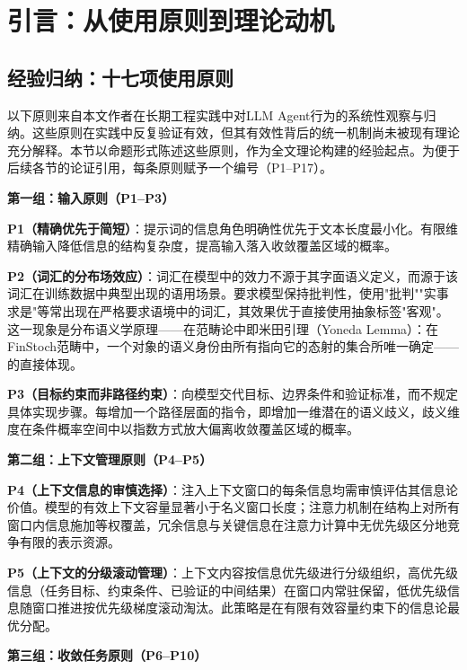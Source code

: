 \documentclass[11pt,a4paper]{article}
\theoremstyle{definition}
\begin{document}
\section{引言：从使用原则到理论动机}
\label{sec:intro}

\subsection{经验归纳：十七项使用原则}

以下原则来自本文作者在长期工程实践中对LLM Agent行为的系统性观察与归纳。这些原则在实践中反复验证有效，但其有效性背后的统一机制尚未被现有理论充分解释。本节以命题形式陈述这些原则，作为全文理论构建的经验起点。为便于后续各节的论证引用，每条原则赋予一个编号（P1--P17）。

\medskip
\textbf{第一组：输入原则（P1--P3）}

\textbf{P1（精确优先于简短）}：提示词的信息角色明确性优先于文本长度最小化。有限维精确输入降低信息的结构复杂度，提高输入落入收敛覆盖区域的概率。

\textbf{P2（词汇的分布场效应）}：词汇在模型中的效力不源于其字面语义定义，而源于该词汇在训练数据中典型出现的语用场景。要求模型保持批判性，使用"批判""实事求是"等常出现在严格要求语境中的词汇，其效果优于直接使用抽象标签"客观"。这一现象是分布语义学原理——在范畴论中即米田引理（Yoneda Lemma）：在FinStoch范畴中，一个对象的语义身份由所有指向它的态射的集合所唯一确定——的直接体现。

\textbf{P3（目标约束而非路径约束）}：向模型交代目标、边界条件和验证标准，而不规定具体实现步骤。每增加一个路径层面的指令，即增加一维潜在的语义歧义，歧义维度在条件概率空间中以指数方式放大偏离收敛覆盖区域的概率。

\medskip
\textbf{第二组：上下文管理原则（P4--P5）}

\textbf{P4（上下文信息的审慎选择）}：注入上下文窗口的每条信息均需审慎评估其信息论价值。模型的有效上下文容量显著小于名义窗口长度；注意力机制在结构上对所有窗口内信息施加等权覆盖，冗余信息与关键信息在注意力计算中无优先级区分地竞争有限的表示资源。

\textbf{P5（上下文的分级滚动管理）}：上下文内容按信息优先级进行分级组织，高优先级信息（任务目标、约束条件、已验证的中间结果）在窗口内常驻保留，低优先级信息随窗口推进按优先级梯度滚动淘汰。此策略是在有限有效容量约束下的信息论最优分配。

\medskip
\textbf{第三组：收敛任务原则（P6--P10）}
\end{document}
